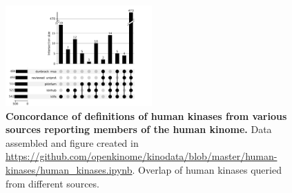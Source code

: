 \documentclass[9pt,lessons]{livecoms}
\begin{document}
\begin{figure}[tbp]
	\centering
	
	

		\centering
        \includegraphics[width=0.5\textwidth]{figures/human_kinase_upset.pdf}

	

    \caption{\textbf{Concordance of definitions of human kinases from various sources reporting members of the human kinome.}
    Data assembled and figure created in \url{https://github.com/openkinome/kinodata/blob/master/human-kinases/human_kinases.ipynb}.
    Overlap of human kinases queried from different sources. %
    }
	\label{figure:kinome-definitions}    
\end{figure}

\end{document}

